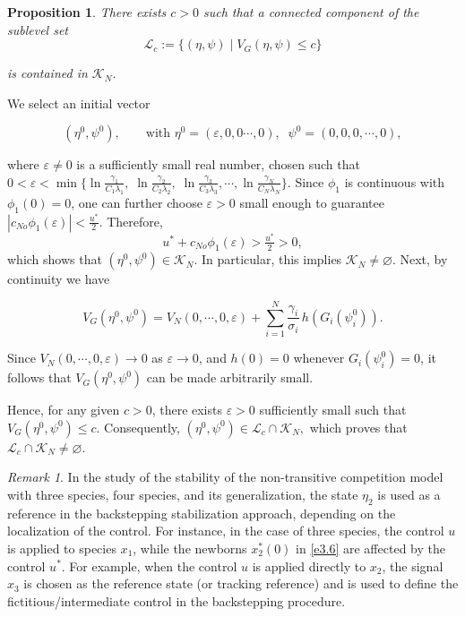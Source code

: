 \documentclass[10pt, a4paper]{amsart}
\makeatletter
\theoremstyle{plain}
\newtheorem{proposition}[lemma]{Proposition}
\theoremstyle{definition}
\theoremstyle{remark}
\newtheorem{remark}[lemma]{Remark}
\renewenvironment{proof}[1][\proofname]{\par
  \pushQED{\qed}%
  \normalfont \topsep6\p@\@plus6\p@\relax
  \trivlist
  \item[\hskip\labelsep
        \itshape
    #1\ \ref{#1}.]\ignorespaces
}{%
  \popQED\endtrivlist\@endpefalse
}
\numberwithin{equation}{section}
\def\to{\rightarrow}
\makeatother
\begin{document}
\begin{proposition}\label{pro3.13}
There exists $c>0$ such that a connected component of the sublevel set
\[
\mathcal L_c := \{(\eta,\psi)\mid V_G(\eta,\psi)\le c\}
\]

is contained in $\mathcal{K}_{N}$.
\end{proposition}
\begin{proof}[of Proposition \ref{pro3.13}]
We select an initial vector

$$
(\eta^0,\psi^0), \qquad \text{with } \eta^0=(\varepsilon,0,0\cdots,0), \;\; \psi^0=(0,0,0,\cdots,0),
$$

where $\varepsilon\neq0$ is a sufficiently small real number, chosen such that $
0<\varepsilon<\min\Big\{\ln\tfrac{\gamma_1}{C_1\lambda_1},\;\ln\tfrac{\gamma_2}{C_2\lambda_2},\;\ln\tfrac{\gamma_3}{C_3\lambda_3},\cdots,\ln\frac{\gamma_{N}}{C_{N}\lambda_{N}}\Big\}.$ Since $\phi_1$ is continuous with $\phi_1(0)=0$, one can further choose $\varepsilon>0$ small enough to guarantee $|c_{No}\phi_1(\varepsilon)|<\tfrac{u^*}{2}.$ Therefore,
$$
u^*+c_{No}\phi_1(\varepsilon)>\tfrac{u^*}{2}>0,
$$
which shows that $(\eta^0,\psi^0)\in \mathcal K_{N}$. In particular, this implies $\mathcal K_{N}\neq\varnothing$. Next, by continuity we have

$$
V_G(\eta^0,\psi^0)=V_{N}(0,\cdots,0,\varepsilon)+\sum_{i=1}^{N} \frac{\gamma_i}{\sigma_i}\, h(G_i(\psi_i^0)).
$$

Since $V_{N}(0,\cdots,0,\varepsilon)\to 0$ as $\varepsilon\to 0$, and $h(0)=0$ whenever $G_i(\psi_i^0)=0$, it follows that $V_G(\eta^0,\psi^0)$ can be made arbitrarily small.

Hence, for any given $c>0$, there exists $\varepsilon>0$ sufficiently small such that $V_G(\eta^0,\psi^0)\leq c.$ Consequently, $(\eta^0,\psi^0)\in \mathcal L_c\cap \mathcal K_{N},$ which proves that $\mathcal L_c\cap \mathcal K_{N} \neq \varnothing.$
\end{proof}

\begin{remark}
In the study of the stability of the non-transitive competition model with three species, four species, and its generalization, the state $\eta_2$ is used as a reference in the backstepping stabilization approach, depending on the localization of the control. For instance, in the case of three species, the control $u$ is applied to species $x_1$, while the newborns $x_2^*(0)$ in \eqref{e3.6} are affected by the control $u^*$.  For example, when the control $u$ is applied directly to $x_2$, the signal $x_3$ is chosen as the reference state (or tracking reference) and is used to define the fictitious/intermediate control in the backstepping procedure.
\end{remark}
\end{document}
